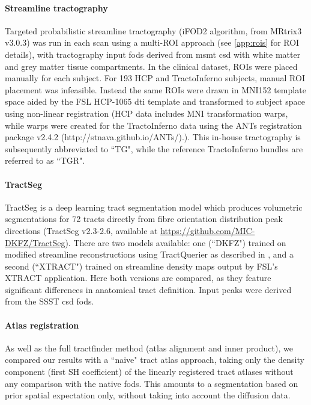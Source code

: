 \paragraph*{Streamline tractography}

Targeted probabilistic streamline tractography (iFOD2 algorithm\autocite{Tournier2010}, from MRtrix3\autocite{Tournier2019} v3.0.3)  was run in each scan using a multi-ROI approach (see \ref{app:rois} for ROI details), with tractography input \glspl{fod} derived from \gls{msmt} \gls{csd} \autocite{Jeurissen2014} with white matter and grey matter tissue compartments.
In the clinical dataset, ROIs were placed manually for each subject.
For 193 HCP and TractoInferno subjects, manual ROI placement was infeasible.
Instead the same ROIs were drawn in MNI152 template space aided by the FSL HCP-1065 \gls{dti} template\autocite{FSLATLAS} and transformed to subject space using non-linear registration
(HCP data includes MNI transformation warps, while warps were created for the TractoInferno data using the ANTs registration package v2.4.2 (http://stnava.github.io/ANTs/).\autocite{Tustison2013,Avants2011}).
This in-house tractography is subsequently abbreviated to ``TG", while the reference TractoInferno bundles are referred to as ``TGR".

\paragraph*{TractSeg}

TractSeg \autocite{Wasserthal2018} is a deep learning tract segmentation model which produces volumetric segmentations for 72 tracts directly from fibre orientation distribution peak directions (TractSeg v2.3-2.6, available at \url{https://github.com/MIC-DKFZ/TractSeg}).
There are two models available: one (``DKFZ") trained on modified streamline reconstructions using TractQuerier \autocite{Wassermann2016} as described in \textcite{Wasserthal2018}, and a second (``XTRACT") trained on streamline density maps output by FSL's XTRACT application. \autocite{Warrington2020}
Here both versions are compared, as they feature significant differences in anatomical tract definition.
Input peaks were derived from the SSST \gls{csd} \glspl{fod}.

\paragraph*{Atlas registration}

As well as the full tractfinder method (atlas alignment and inner product), we compared our results with a ``naive" tract atlas approach, taking only the density component (first SH coefficient) of the linearly registered tract atlases without any comparison with the native \glspl{fod}.
This amounts to a segmentation based on prior spatial expectation only, without taking into account the diffusion data.


